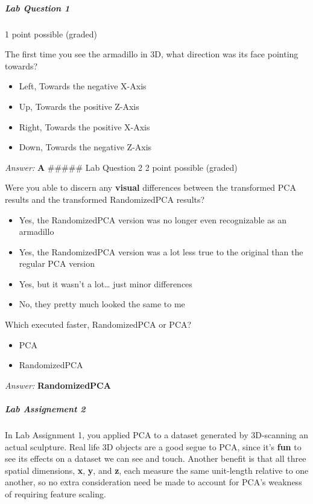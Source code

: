 \documentclass[11pt]{article}
\providecommand{\tightlist}{%
      \setlength{\itemsep}{0pt}\setlength{\parskip}{0pt}}
\begin{document}
\subparagraph{Lab Question 1}\label{lab-question-1}

1 point possible (graded)

The first time you see the armadillo in 3D, what direction was its face
pointing towards?

\begin{itemize}
\tightlist
\item
  Left, Towards the negative X-Axis
\item
  Up, Towards the positive Z-Axis
\item
  Right, Towards the positive X-Axis
\item
  Down, Towards the negative Z-Axis
\end{itemize}

\emph{Answer:} \textbf{A} \#\#\#\#\# Lab Question 2 2 point possible
(graded)

Were you able to discern any \textbf{visual} differences between the
transformed PCA results and the transformed RandomizedPCA results?

\begin{itemize}
\tightlist
\item
  Yes, the RandomizedPCA version was no longer even recognizable as an
  armadillo
\item
  Yes, the RandomizedPCA version was a lot less true to the original
  than the regular PCA version
\item
  Yes, but it wasn't a lot\ldots{} just minor differences
\item
  No, they pretty much looked the same to me
\end{itemize}

Which executed faster, RandomizedPCA or PCA?

\begin{itemize}
\tightlist
\item
  PCA
\item
  RandomizedPCA
\end{itemize}

\emph{Answer:} \textbf{RandomizedPCA}

\subparagraph{Lab Assignement 2}\label{lab-assignement-2}

In Lab Assignment 1, you applied PCA to a dataset generated by
3D-scanning an actual sculpture. Real life 3D objects are a good segue
to PCA, since it's \textbf{fun} to see its effects on a dataset we can
see and touch. Another benefit is that all three spatial dimensions,
\textbf{x}, \textbf{y}, and \textbf{z}, each measure the same
unit-length relative to one another, so no extra consideration need be
made to account for PCA's weakness of requiring feature scaling.
\end{document}
